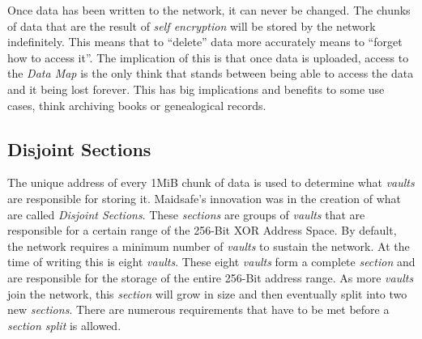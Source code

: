 Once data has been written to the network, it can never be changed. The chunks of data that are the result of \textit{self encryption} will be stored by the network indefinitely. This means that to ``delete'' data more accurately means to ``forget how to access it''. The implication of this is that once data is uploaded, access to the \textit{Data Map} is the only think that stands between being able to access the data and it being lost forever. This has big implications and benefits to some use cases, think archiving books or genealogical records.

\subsection{Disjoint Sections}

The unique address of every 1MiB chunk of data is used to determine what \textit{vaults} are responsible for storing it. Maidsafe's innovation was in the creation of what are called \textit{Disjoint Sections}. These \textit{sections} are groups of \textit{vaults} that are responsible for a certain range of the 256-Bit XOR Address Space. By default, the network requires a minimum number of \textit{vaults} to sustain the network. At the time of writing this is eight \textit{vaults}. These eight \textit{vaults} form a complete \textit{section} and are responsible for the storage of the entire 256-Bit address range. As more \textit{vaults} join the network, this \textit{section} will grow in size and then eventually split into two new \textit{sections}. There are numerous requirements that have to be met before a \textit{section split} is allowed.


